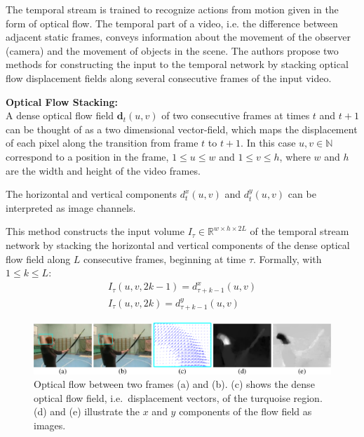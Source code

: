 The temporal stream is trained to recognize actions from motion given in the form of optical flow.
The temporal part of a video, i.e. the difference between adjacent static frames, conveys information about the movement of the observer (camera) and the movement of objects in the scene.
The authors propose two methods for constructing the input to the temporal network by stacking optical flow displacement fields along several consecutive frames of the input video.

\textbf{Optical Flow Stacking:} \\
A dense optical flow field $\mathbf{d}_t(u,v)$ of two consecutive frames at times $t$ and $t+1$ can be thought of as a two dimensional vector-field, which maps the displacement of each pixel along the transition from frame $t$ to $t+1$.
In this case $u,v \in \mathbb{N}$ correspond to a position in the frame, $1 \leq u \leq w$ and $1 \leq v \leq h$, where $w$ and $h$ are the width and height of the video frames.

The horizontal and vertical components $d_t^x(u,v)$ and $d_t^y(u,v)$ can be interpreted as image channels.

This method constructs the input volume $I_\tau \in \mathbb{R}^{w \times h \times 2L}$ of the temporal stream network by stacking the horizontal and vertical components of the dense optical flow field along $L$ consecutive frames, beginning at time $\tau$. Formally, with $1 \leq k \leq L$:
\begin{align*}
    I_\tau(u,v,2k-1) = d_{\tau + k - 1}^x(u,v) \\
    I_\tau(u,v,2k) = d_{\tau + k - 1}^{y}(u,v)
\end{align*}

\begin{figure}[H]
    \centering
    \includegraphics[width=\textwidth]{img_deep/twostream_flow}
    \caption{Optical flow between two frames (a) and (b). (c) shows the dense optical flow field, i.e.\ displacement vectors, of the turquoise region. (d) and (e) illustrate the $x$ and $y$ components of the flow field as images. \cite{simonyan_two-stream_2014}}
    \label{fig:twostream_flow}
\end{figure}

